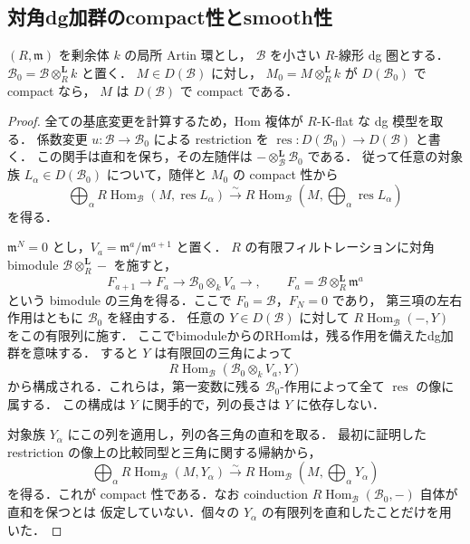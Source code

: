 \subsection{対角dg加群のcompact性とsmooth性}
\begin{lemma}
\label{lem:dg-compact-nilpotent-lift}
$(R,\mathfrak m)$ を剰余体 $k$ の局所 Artin 環とし，
$\mathcal B$ を小さい $R$-線形 dg 圏とする．
$\mathcal B_0=\mathcal B\otimes_R^{\mathbf L}k$ と置く．
$M\in D(\mathcal B)$ に対し，
$M_0=M\otimes_R^{\mathbf L}k$ が $D(\mathcal B_0)$ で compact なら，
$M$ は $D(\mathcal B)$ で compact である．
\end{lemma}
\begin{proof}
全ての基底変更を計算するため，Hom 複体が $R$-K-flat な dg 模型を取る．
係数変更 $u:\mathcal B\to\mathcal B_0$ による restriction を
$\operatorname{res}:D(\mathcal B_0)\to D(\mathcal B)$ と書く．
この関手は直和を保ち，その左随伴は
$-\otimes_{\mathcal B}^{\mathbf L}\mathcal B_0$ である．
従って任意の対象族 $L_\alpha\in D(\mathcal B_0)$ について，随伴と
$M_0$ の compact 性から
\[
 \bigoplus_\alpha R\operatorname{Hom}_{\mathcal B}
       (M,\operatorname{res}L_\alpha)
 \xrightarrow{\sim}
 R\operatorname{Hom}_{\mathcal B}
       \left(M,\bigoplus_\alpha\operatorname{res}L_\alpha\right)
\]
を得る．

$\mathfrak m^N=0$ とし，$V_a=\mathfrak m^a/\mathfrak m^{a+1}$ と置く．
$R$ の有限フィルトレーションに対角 bimodule
$\mathcal B\otimes_R^{\mathbf L}-$ を施すと，
\[
 F_{a+1}\longrightarrow F_a
 \longrightarrow\mathcal B_0\otimes_kV_a\longrightarrow,
 \qquad F_a=\mathcal B\otimes_R^{\mathbf L}\mathfrak m^a
\]
という bimodule の三角を得る．ここで $F_0=\mathcal B$，$F_N=0$ であり，
第三項の左右作用はともに $\mathcal B_0$ を経由する．
任意の $Y\in D(\mathcal B)$ に対して
$R\operatorname{Hom}_{\mathcal B}(-,Y)$ をこの有限列に施す．
ここでbimoduleからのRHomは，残る作用を備えたdg加群を意味する．
すると $Y$ は有限回の三角によって
\[
 R\operatorname{Hom}_{\mathcal B}
    (\mathcal B_0\otimes_kV_a,Y)
\]
から構成される．これらは，第一変数に残る
$\mathcal B_0$-作用によって全て $\operatorname{res}$ の像に属する．
この構成は $Y$ に関手的で，列の長さは $Y$ に依存しない．

対象族 $Y_\alpha$ にこの列を適用し，列の各三角の直和を取る．
最初に証明した restriction の像上の比較同型と三角に関する帰納から，
\[
 \bigoplus_\alpha R\operatorname{Hom}_{\mathcal B}(M,Y_\alpha)
 \xrightarrow{\sim}
 R\operatorname{Hom}_{\mathcal B}
       \left(M,\bigoplus_\alpha Y_\alpha\right)
\]
を得る．これが compact 性である．なお coinduction
$R\operatorname{Hom}_{\mathcal B}(\mathcal B_0,-)$ 自体が直和を保つとは
仮定していない．個々の $Y_\alpha$ の有限列を直和したことだけを用いた．
\end{proof}

